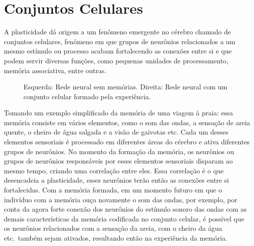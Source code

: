 \section{Conjuntos Celulares}

A plasticidade dá origem a um fenômeno emergente no cérebro chamado de conjuntos celulares, fenômeno em que grupos de neurônios
relacionados a um mesmo estímulo ou processo acabam fortalecendo as conexões entre si e que podem servir diversas funções, como
pequenas unidades de processamento, memória associativa, entre outras.

\begin{figure}[!ht]
\caption{Esquerda: Rede neural sem memórias. Direita: Rede neural com um conjunto celular formado pela experiência.}
\end{figure}

Tomando um exemplo simplificado da memória de uma viagem à praia: essa memória consiste em vários elementos, como o som das ondas,
a sensação de areia quente, o cheiro de água salgada e a visão de gaivotas etc. Cada um desses elementos sensoriais é processado
em diferentes áreas do cérebro e ativa diferentes grupos  de neurônios. No momento da formação da memória, os neurônios ou grupos
de neurônios responsáveis por esses elementos sensoriais disparam ao mesmo tempo, criando uma correlação entre eles. Essa
correlação é o que desencadeia a plasticidade, esses neurônios terão então as conexões entre si fortalecidas. Com a memória
formada, em um momento futuro em que o indivíduo com a memória ouça novamente o som das ondas, por exemplo, por conta da agora
forte conexão dos neurônios do estímulo sonoro das ondas com as demais características da memória codificada no conjunto celular,
é possível que os neurônios relacionados com a sensação da areia, com o cheiro da água etc.\ também sejam ativados, resultando
então na experiência da memória.

